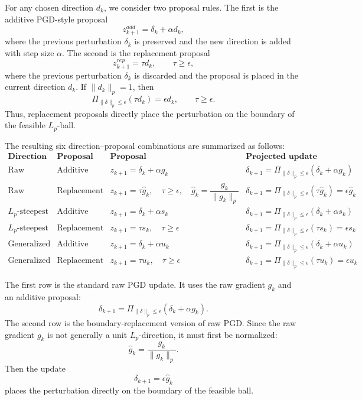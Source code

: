 \documentclass{article}
\begin{document}
For any chosen direction \(d_k\), we consider two proposal rules. The first is the additive PGD-style proposal
\[
z_{k+1}^{add}
=
\delta_k+\alpha d_k,
\]
where the previous perturbation \(\delta_k\) is preserved and the new direction is added with step size \(\alpha\). The second is the replacement proposal
\[
z_{k+1}^{rep}
=
\tau d_k,
\qquad
\tau\ge \epsilon,
\]
where the previous perturbation \(\delta_k\) is discarded and the proposal is placed in the current direction \(d_k\). If \(\|d_k\|_p=1\), then
\[
\Pi_{\|\delta\|_p\le\epsilon}(\tau d_k)
=
\epsilon d_k,
\qquad
\tau\ge\epsilon.
\]
Thus, replacement proposals directly place the perturbation on the boundary of the feasible \(L_p\)-ball.

The resulting six direction--proposal combinations are summarized as follows:
\[
\begin{array}{c|c|c|c}
\textbf{Direction rule}
&
\textbf{Proposal rule}
&
\textbf{Proposal}
&
\textbf{Projected update}
\\
\hline
\text{Raw gradient}
&
\text{Additive}
&
z_{k+1}
=
\delta_k+\alpha g_k
&
\delta_{k+1}
=
\Pi_{\|\delta\|_p\le\epsilon}
(\delta_k+\alpha g_k)
\\
\hline
\text{Raw gradient}
&
\text{Replacement}
&
z_{k+1}
=
\tau \widehat g_k,
\quad
\tau\ge\epsilon,
\quad
\widehat g_k=
\dfrac{g_k}{\|g_k\|_p}
&
\delta_{k+1}
=
\Pi_{\|\delta\|_p\le\epsilon}
(\tau \widehat g_k)
=
\epsilon \widehat g_k
\\
\hline
L_p\text{-steepest}
&
\text{Additive}
&
z_{k+1}
=
\delta_k+\alpha s_k
&
\delta_{k+1}
=
\Pi_{\|\delta\|_p\le\epsilon}
(\delta_k+\alpha s_k)
\\
\hline
L_p\text{-steepest}
&
\text{Replacement}
&
z_{k+1}
=
\tau s_k,
\quad
\tau\ge\epsilon
&
\delta_{k+1}
=
\Pi_{\|\delta\|_p\le\epsilon}
(\tau s_k)
=
\epsilon s_k
\\
\hline
\text{Generalized power}
&
\text{Additive}
&
z_{k+1}
=
\delta_k+\alpha u_k
&
\delta_{k+1}
=
\Pi_{\|\delta\|_p\le\epsilon}
(\delta_k+\alpha u_k)
\\
\hline
\text{Generalized power}
&
\text{Replacement}
&
z_{k+1}
=
\tau u_k,
\quad
\tau\ge\epsilon
&
\delta_{k+1}
=
\Pi_{\|\delta\|_p\le\epsilon}
(\tau u_k)
=
\epsilon u_k
\end{array}
\]

The first row is the standard raw PGD update. It uses the raw gradient \(g_k\) and an additive proposal:
\[
\delta_{k+1}
=
\Pi_{\|\delta\|_p\le\epsilon}
(\delta_k+\alpha g_k).
\]
The second row is the boundary-replacement version of raw PGD. Since the raw gradient \(g_k\) is not generally a unit \(L_p\)-direction, it must first be normalized:
\[
\widehat g_k
=
\frac{g_k}{\|g_k\|_p}.
\]
Then the update
\[
\delta_{k+1}
=
\epsilon \widehat g_k
\]
places the perturbation directly on the boundary of the feasible ball.
\end{document}
